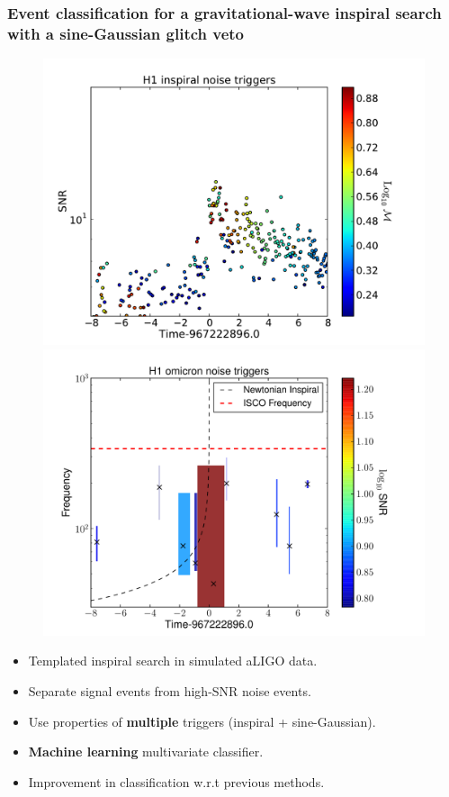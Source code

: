\documentclass[]{beamer}
\begin{document}
%
%
%
\begin{frame}
  \frametitle{Event classification for a gravitational-wave inspiral search \\
 with a sine-Gaussian glitch veto}
\begin{figure}
\vspace*{-0.5cm}
{
  \includegraphics[scale=0.20]{images/H1-inspiral-noise-trigs_POSTER.pdf}
}
\hspace{0cm}
{
  \includegraphics[scale=0.20]{images/H1-omicron-noise-trigs_POSTER.pdf}
}
\vspace*{-0.5cm}
\end{figure}

\begin{itemize}
\item Templated inspiral search in simulated aLIGO data.
\item Separate signal events from high-SNR noise events.
\item Use properties of {\bf multiple} triggers (inspiral + sine-Gaussian). 
\item {\bf Machine learning} multivariate classifier.
\item Improvement in classification w.r.t previous methods.
\end{itemize}
\end{frame}
\end{document}
